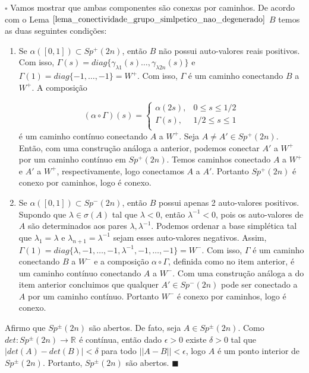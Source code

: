 \documentclass[12pt]{book}
\newenvironment{prova}[1]{$\square$ #1}{\hfill$\blacksquare$}
\newcommand{\funcaocond}[5]{
	#1 = 
	\left\{
	\begin{array}{cc}
		#2, & #3\\
		#4, & #5\\
	\end{array}
	\right.
}
\newcommand{\gruposimpleticonaodegenerado}[1]{Sp^{#1}(2n)}
\newcommand{\norma}[1]{||#1||}
\newcommand{\real}[1]{\mathbb{R}^{#1}}
\newcommand{\reta}{\real{}}
\begin{document}
\begin{prova}
		Vamos mostrar que ambas componentes são conexas por caminhos. De acordo com o Lema $\ref{lema_conectividade_grupo_simlpetico_nao_degenerado}$ $B$ temos as duas seguintes condições:
		\begin{enumerate}
			\item Se $\alpha([0,1]) \subset \gruposimpleticonaodegenerado{+}$, então $B$ não possui auto-valores reais positivos. Com isso, $\Gamma(s) = diag\{\gamma_{\lambda{1}}(s)\dots, \gamma_{\lambda{2n}}(s)\}$ e $\Gamma(1) = diag \{-1, \dots, -1\} = W^{+}$. Com isso, $\Gamma$ é um caminho conectando $B$ a $W^{+}$. A composição 
			
			$$
			\funcaocond{(\alpha\circ \Gamma)(s)
				}{\alpha(2s)}{0\leq s \leq 1/2}{\Gamma(s)}{1/2\leq s \leq 1}
			$$
			é um caminho contínuo conectando $A$ a $W^{+}$. Seja $A\neq A' \in \gruposimpleticonaodegenerado{+}$. Então, com uma construção análoga a anterior, podemos conectar $A'$ a $W^{+}$ por um caminho contínuo em $\gruposimpleticonaodegenerado{+}$. Temos caminhos conectado $A$ a $W^{+}$ e $A'$ a $W^{+}$, respectivamente, logo conectamos $A$ a $A'$. Portanto $\gruposimpleticonaodegenerado{+}$ é conexo por caminhos, logo é conexo.
			
			\item Se $\alpha([0,1]) \subset \gruposimpleticonaodegenerado{-}$, então $B$ possui apenas 2 auto-valores positivos. Supondo que $\lambda \in \sigma(A)$ tal que $\lambda<0$, então $\lambda^{-1} < 0$, pois os auto-valores de $A$ são determinados aos pares $\lambda, \lambda^{-1}$. Podemos ordenar a base simplética tal que $\lambda_{1}=\lambda$ e $\lambda_{n+1}=\lambda^{-1}$ sejam esses auto-valores negativos. Assim, $\Gamma(1) = diag\{\lambda, -1, \dots, -1, \lambda^{-1}, -1, \dots, -1\} = W^{-}$. Com isso, $\Gamma$ é um caminho conectando $B$ a $W^{-}$ e a composição $\alpha \circ \Gamma$, definida como no item anterior, é um caminho contínuo conectando $A$ a $W^{-}$. Com uma construção análoga a do item anterior concluimos que qualquer $A' \in \gruposimpleticonaodegenerado{-}$ pode ser conectado a $A$ por um caminho contínuo. Portanto $W^{-}$ é conexo por caminhos, logo é conexo.
		\end{enumerate}
		
		Afirmo que $\gruposimpleticonaodegenerado{\pm}$ são abertos. De fato, seja $A \in \gruposimpleticonaodegenerado{\pm}$. Como $det: \gruposimpleticonaodegenerado{\pm}\to \reta$ é contínua, então dado $\epsilon>0$ existe $\delta>0$ tal que $|det(A)-det(B)|<\delta$ para todo $\norma{A-B}<\epsilon$, logo $A$ é um ponto interior de $\gruposimpleticonaodegenerado{\pm}$. Portanto, $\gruposimpleticonaodegenerado{\pm}$ são abertos.
	\end{prova}
	
\end{document}

